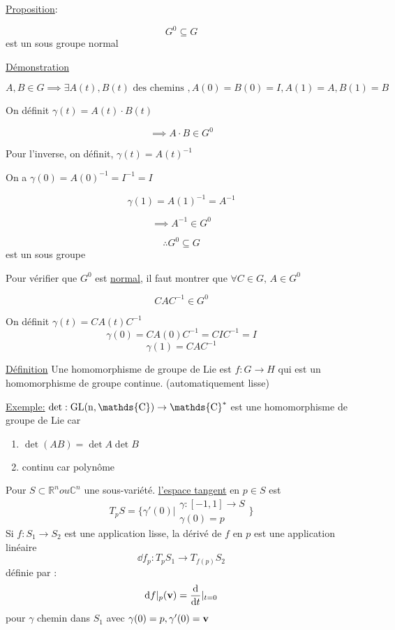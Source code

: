 \underline{Proposition}:

\[ G^{0}\subseteq  G\] est un sous groupe normal

\underline{Démonstration}


\(A,B \in G \implies \exists A(t), B(t) \text{ des chemins  }, A(0) = B(0) = I, A(1) = A, B(1) =B\)

On définit \(\gamma(t) = A(t) \cdot B(t)\)

\[ \implies A \cdot B \in G^{0} \]

Pour l'inverse, on définit, \(\gamma(t) = A(t) ^{-1}\)

On a \(\gamma(0)=  A(0) ^{-1} = I ^{-1} = I \)

\[ \gamma(1) = A(1)^{-1} = A ^{-1} \]

\[ \implies A^{-1} \in G^{0} \]

\[ \therefore G^{0}\subseteq G \] est un sous groupe 


Pour vérifier que \( G^{0}\) est \underline{normal}, il faut montrer que \(\forall C \in G, \, A \in G^{0}\) 

\[ CAC^{-1} \in G^{0} \]

On définit \( \gamma(t) = C A(t) C^{-1} \)
\[  \gamma(0)= C A(0) C ^{-1} = CI C^{-1} =I \]
\[ \gamma(1) = CA C^{-1} \]



\underline{Définition} Une homomorphisme de groupe de Lie est \(f: G \to H\) qui est un homomorphisme de groupe continue. (automatiquement lisse)

\underline{Exemple:} \(\det: \rm{GL}(n, \mathds{C}) \to \mathds{C}^{*}\) est une homomorphisme de groupe de Lie car 

\begin{enumerate}
	\item \(\det (AB) = \det A \det B\)
	\item continu car polynôme
\end{enumerate}

\begin{tcolorbox}[title=Rappel]
	Pour \( S \subset \mathds{R}^n ou \mathds{C}^n \) une sous-variété. \underline{l'espace tangent} en \(p  \in S\) est
	\[ T_p S = \{ \gamma' (0) | \begin{matrix}
		\gamma : [-1,1] \to S\\ \gamma(0) = p
\end{matrix}\}\]
Si \(f:S_1 \to S_2 \) est une application lisse, la dérivé de \(f\) en \(p\) est une application linéaire
\[ \dd f_p : T_p S_1 \to T_{f(p)} S_2 \] définie par : \[ \dd f|_p (\vb{v}) = \dv{{}}{t} (f \circ \gamma)|_{t=0}  \] pour \(\gamma \) chemin dans \(S_1\) avec \(\gamma(0)= p, \gamma'(0) = \vb{v}\) 

\end{tcolorbox}


